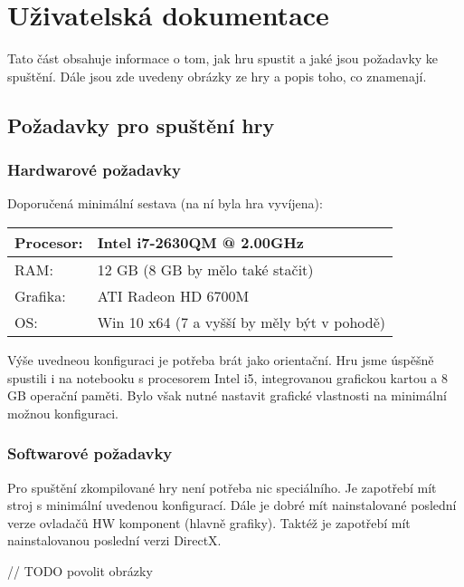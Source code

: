
\chapter{Uživatelská dokumentace}

Tato část obsahuje informace o tom, jak hru spustit a jaké jsou požadavky ke spuštění. Dále jsou zde uvedeny obrázky ze hry a popis toho, co znamenají. 

\section{Požadavky pro spuštění hry}
\subsection{Hardwarové požadavky}

Doporučená minimální sestava (na ní byla hra vyvíjena): 

\begin{center}
	\begin{tabular} { | l | l |}
		\hline
		Procesor: 	&	Intel i7-2630QM @ 2.00GHz \\	\hline
		RAM:		&	12 GB	(8 GB by mělo také stačit) \\	\hline
		Grafika:	&	ATI Radeon HD 6700M \\	\hline
		OS:		&	Win 10 x64  (7 a vyšší by měly být v pohodě) \\
		\hline
	\end{tabular}
\end{center}

Výše uvedneou konfiguraci je potřeba brát jako orientační. Hru jsme úspěšně spustili i na notebooku s procesorem Intel i5, integrovanou grafickou kartou a 8 GB operační paměti. Bylo však nutné nastavit grafické vlastnosti na minimální možnou konfiguraci. 

\subsection{Softwarové požadavky}

Pro spuštění zkompilované hry není potřeba nic speciálního. Je zapotřebí mít stroj s minimální uvedenou konfigurací. Dále je dobré mít nainstalované poslední verze ovladačů HW komponent (hlavně grafiky).
Taktéž je zapotřebí mít nainstalovanou poslední verzi DirectX. 


// TODO povolit obrázky


%
%
%
%
%
%
%
%
%
%

